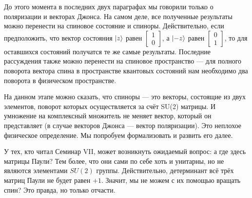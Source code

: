 До этого момента в последних двух параграфах мы говорили только о поляризации и
векторах Джонса. На самом деле, все полученные результаты можно перенести на
спиновое состояние и спиноры. Действительно, если предположить, что вектор
состояния $\lvert z\rangle$ равен $\begin{bmatrix} 1 \\ 0 \end{bmatrix}$, а $\lvert-z\rangle$ равен $\begin{bmatrix} 0 \\ 1 \end{bmatrix}$, то для оставшихся состояний получатся те же самые результаты. Последние
рассуждения также можно перенести на спиновое пространство --- для полного
поворота вектора спина в пространстве квантовых состояний нам необходимо два
поворота в физическом пространстве.

На данном этапе можно сказать, что спиноры --- это векторы, состоящие из двух
элементов, поворот которых осуществляется за счёт SU(2) матрицы. И умножение на
комплексный множитель не меняет вектор, который он представляет (в случае
векторов Джонса --- вектор поляризации). Это неплохое физическое определение.
Мы попробуем формализовать и развить его далее.

У тех, кто читал Семинар VII, может возникнуть ожидаемый вопрос: а где здесь
матрицы Паули? Тем более, что они сами по себе хоть и унитарны, но не являются
элементами $SU(2)$ группы. Действительно, детерминант всё трёх матриц Паули не
будет равен $+1$. Значит, мы не можем с их помощью вращать спин? Это правда, но
только отчасти.
